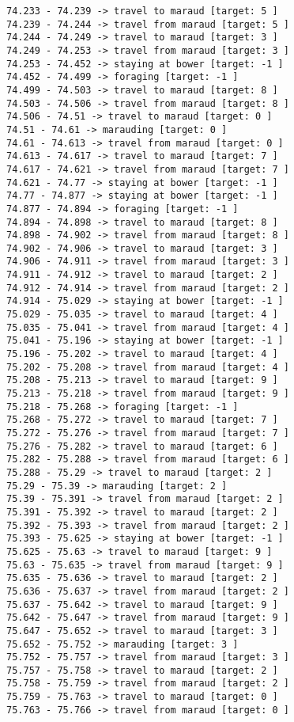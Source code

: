\documentclass[11pt]{article}
\begin{document}
\begin{Verbatim}[commandchars=\\\{\}]
74.233 - 74.239 -> travel to maraud [target: 5 ]
74.239 - 74.244 -> travel from maraud [target: 5 ]
74.244 - 74.249 -> travel to maraud [target: 3 ]
74.249 - 74.253 -> travel from maraud [target: 3 ]
74.253 - 74.452 -> staying at bower [target: -1 ]
74.452 - 74.499 -> foraging [target: -1 ]
74.499 - 74.503 -> travel to maraud [target: 8 ]
74.503 - 74.506 -> travel from maraud [target: 8 ]
74.506 - 74.51 -> travel to maraud [target: 0 ]
74.51 - 74.61 -> marauding [target: 0 ]
74.61 - 74.613 -> travel from maraud [target: 0 ]
74.613 - 74.617 -> travel to maraud [target: 7 ]
74.617 - 74.621 -> travel from maraud [target: 7 ]
74.621 - 74.77 -> staying at bower [target: -1 ]
74.77 - 74.877 -> staying at bower [target: -1 ]
74.877 - 74.894 -> foraging [target: -1 ]
74.894 - 74.898 -> travel to maraud [target: 8 ]
74.898 - 74.902 -> travel from maraud [target: 8 ]
74.902 - 74.906 -> travel to maraud [target: 3 ]
74.906 - 74.911 -> travel from maraud [target: 3 ]
74.911 - 74.912 -> travel to maraud [target: 2 ]
74.912 - 74.914 -> travel from maraud [target: 2 ]
74.914 - 75.029 -> staying at bower [target: -1 ]
75.029 - 75.035 -> travel to maraud [target: 4 ]
75.035 - 75.041 -> travel from maraud [target: 4 ]
75.041 - 75.196 -> staying at bower [target: -1 ]
75.196 - 75.202 -> travel to maraud [target: 4 ]
75.202 - 75.208 -> travel from maraud [target: 4 ]
75.208 - 75.213 -> travel to maraud [target: 9 ]
75.213 - 75.218 -> travel from maraud [target: 9 ]
75.218 - 75.268 -> foraging [target: -1 ]
75.268 - 75.272 -> travel to maraud [target: 7 ]
75.272 - 75.276 -> travel from maraud [target: 7 ]
75.276 - 75.282 -> travel to maraud [target: 6 ]
75.282 - 75.288 -> travel from maraud [target: 6 ]
75.288 - 75.29 -> travel to maraud [target: 2 ]
75.29 - 75.39 -> marauding [target: 2 ]
75.39 - 75.391 -> travel from maraud [target: 2 ]
75.391 - 75.392 -> travel to maraud [target: 2 ]
75.392 - 75.393 -> travel from maraud [target: 2 ]
75.393 - 75.625 -> staying at bower [target: -1 ]
75.625 - 75.63 -> travel to maraud [target: 9 ]
75.63 - 75.635 -> travel from maraud [target: 9 ]
75.635 - 75.636 -> travel to maraud [target: 2 ]
75.636 - 75.637 -> travel from maraud [target: 2 ]
75.637 - 75.642 -> travel to maraud [target: 9 ]
75.642 - 75.647 -> travel from maraud [target: 9 ]
75.647 - 75.652 -> travel to maraud [target: 3 ]
75.652 - 75.752 -> marauding [target: 3 ]
75.752 - 75.757 -> travel from maraud [target: 3 ]
75.757 - 75.758 -> travel to maraud [target: 2 ]
75.758 - 75.759 -> travel from maraud [target: 2 ]
75.759 - 75.763 -> travel to maraud [target: 0 ]
75.763 - 75.766 -> travel from maraud [target: 0 ]

\end{Verbatim}
\end{document}
